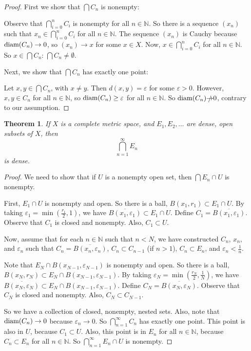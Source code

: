 \documentclass{amsart}
\newcommand{\vep}{\varepsilon}
\newcommand{\N}{\mathbb{N}}
\newcommand{\diam}{\text{\rm diam}}
\newtheorem{thm}{Theorem}[section]
\theoremstyle{definition}
\begin{document}
\begin{proof}
First we show that $\bigcap C_n$ is nonempty: 

Observe that $\bigcap\limits_{i=0}^n C_i$ is nonempty for all $n \in \N$. 
So there is a sequence $(x_n)$ such that $x_n \in \bigcap\limits_{i=0}^n C_i$ for all $n \in \N$. 
The sequence $(x_n)$ is Cauchy because $\diam(C_n) \to 0$, so $(x_n) \to x$ for some $x \in X$.
Now, $x \in \bigcap\limits_{i=0}^n C_i$ for all $n \in \N$.
So $x \in \bigcap C_n$: $\bigcap C_n \neq \emptyset$.

Next, we show that $\bigcap C_n$ has exactly one point:

Let $x, y \in \bigcap C_n$, with $x \neq y$. 
Then $d(x,y) = \vep$ for some $\vep >0$. 
However, $x,y \in C_n$ for all $n \in \N$,
so $\diam(C_n) \geq \vep$ for all $n \in \N$. 
So $\diam(C_n) \slashed{\to} 0$, contrary to our assumption.
\end{proof}

\begin{thm}If $X$ is a complete metric space, and $E_1, E_2, \ldots$ are dense, open subsets of $X$, then
\begin{displaymath}
\bigcap\limits_{n = 1}^{\infty} E_n
\end{displaymath}
is dense.
\end{thm}

\begin{proof}
We need to show that if $U$ is a nonempty open set, then $\bigcap E_n \cap U$ is nonempty.

First, $E_1 \cap U$ is nonempty and open.
So there is a ball, $B(x_1,r_1) \subset E_1 \cap U$.
By taking $\vep_1 = \min(\frac{r_1}{2},1)$, we have $\overline{B(x_1,\vep_1)} \subset E_1 \cap U$.
Define $C_1 = \overline{B(x_1,\vep_1)}$.
Observe that $C_1$ is closed and nonempty. Also, $C_1 \subset U$.

Now, assume that for each $n \in \N$ such that $n < N$, we have constructed $C_{n}$, $x_{n}$, and $\vep_{n}$ such that $C_{n} = \overline{B(x_{n},\vep_{n})}$, $C_n \subset C_{n-1}$ (if $n >1$), $C_{n} \subset E_{n}$, and $\vep_{n} < \frac{1}{n}$.

Note that $E_N \cap B(x_{N-1},\vep_{N-1})$ is nonempty and open.
So there is a ball, $B(x_N,r_N) \subset E_N \cap B(x_{N-1},\vep_{N-1})$.
By taking $\vep_N = \min(\frac{r_N}{2},\frac{1}{N})$, we have $\overline{B(x_N,\vep_N)} \subset E_N \cap B(x_{N-1},\vep_{N-1})$.
Define $C_N = \overline{B(x_N,\vep_N)}$.
Observe that $C_N$ is closed and nonempty. Also, $C_N \subset C_{N-1}$.

So we have a collection of closed, nonempty, nested sets.
Also, note that $\diam(C_n) \to 0$ because $\vep_n \to 0$. 
So $\bigcap\limits_{n=1}^\infty C_n$ has exactly one point.
This point is also in $U$, because $C_1 \subset U$.
Also, this point is in $E_n$ for all $n \in \N$, because $C_n \subset E_n$ for all $n \in \N$.
So $\bigcap\limits_{n=1}^\infty E_n \cap U$ is nonempty.

\end{proof}
\end{document}
